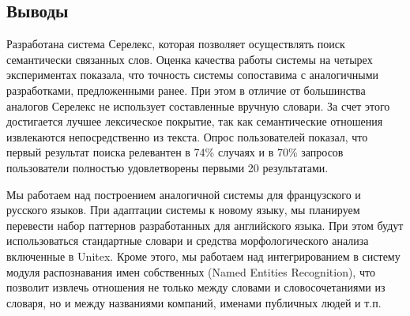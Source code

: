 \documentclass[a4paper,10pt,twoside]{article}
\begin{document}
\subsection{Выводы}

Разработана система Серелекс, которая позволяет осуществлять поиск семантически связанных слов. Оценка качества работы системы на четырех экспериментах показала, что точность системы сопоставима с аналогичными разработками, предложенными ранее. При этом в отличие от большинства аналогов Серелекс не использует составленные вручную словари. За счет этого достигается лучшее лексическое покрытие, так как семантические отношения извлекаются непосредственно из текста. Опрос пользователей показал, что первый результат поиска релевантен в 74\% случаях и в 70\% запросов пользователи полностью удовлетворены первыми 20 результатами.   

Мы работаем над построением аналогичной системы для французского и русского языков. При адаптации  системы к новому языку, мы планируем перевести набор паттернов разработанных для английского языка. При этом будут использоваться стандартные словари и средства морфологического анализа включенные в Unitex. Кроме этого, мы работаем над интегрированием в систему модуля распознавания имен собственных (Named Entities Recognition), что позволит извлечь отношения не только между словами и словосочетаниями из словаря, но и между названиями компаний, именами публичных людей и т.п. 



\end{document}
